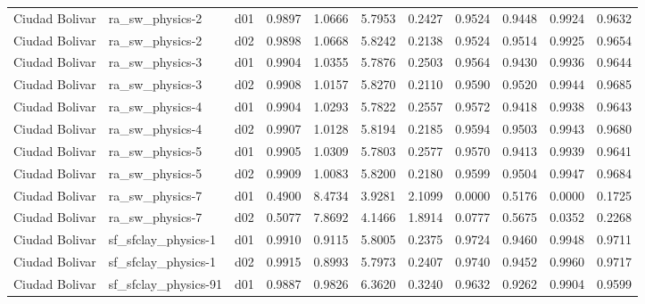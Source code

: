 \begin{longtable}{lllrrrrrrrr}
       Ciudad Bolivar  &       ra\_sw\_physics-2 &     d01 &   0.9897 &   1.0666 &   5.7953 &       0.2427 &        0.9524 &       0.9448 &           0.9924 &  0.9632 \\
       Ciudad Bolivar  &       ra\_sw\_physics-2 &     d02 &   0.9898 &   1.0668 &   5.8242 &       0.2138 &        0.9524 &       0.9514 &           0.9925 &  0.9654 \\
       Ciudad Bolivar  &       ra\_sw\_physics-3 &     d01 &   0.9904 &   1.0355 &   5.7876 &       0.2503 &        0.9564 &       0.9430 &           0.9936 &  0.9644 \\
       Ciudad Bolivar  &       ra\_sw\_physics-3 &     d02 &   0.9908 &   1.0157 &   5.8270 &       0.2110 &        0.9590 &       0.9520 &           0.9944 &  0.9685 \\
       Ciudad Bolivar  &       ra\_sw\_physics-4 &     d01 &   0.9904 &   1.0293 &   5.7822 &       0.2557 &        0.9572 &       0.9418 &           0.9938 &  0.9643 \\
       Ciudad Bolivar  &       ra\_sw\_physics-4 &     d02 &   0.9907 &   1.0128 &   5.8194 &       0.2185 &        0.9594 &       0.9503 &           0.9943 &  0.9680 \\
       Ciudad Bolivar  &       ra\_sw\_physics-5 &     d01 &   0.9905 &   1.0309 &   5.7803 &       0.2577 &        0.9570 &       0.9413 &           0.9939 &  0.9641 \\
       Ciudad Bolivar  &       ra\_sw\_physics-5 &     d02 &   0.9909 &   1.0083 &   5.8200 &       0.2180 &        0.9599 &       0.9504 &           0.9947 &  0.9684 \\
       Ciudad Bolivar  &       ra\_sw\_physics-7 &     d01 &   0.4900 &   8.4734 &   3.9281 &       2.1099 &        0.0000 &       0.5176 &           0.0000 &  0.1725 \\
       Ciudad Bolivar  &       ra\_sw\_physics-7 &     d02 &   0.5077 &   7.8692 &   4.1466 &       1.8914 &        0.0777 &       0.5675 &           0.0352 &  0.2268 \\
       Ciudad Bolivar  &   sf\_sfclay\_physics-1 &     d01 &   0.9910 &   0.9115 &   5.8005 &       0.2375 &        0.9724 &       0.9460 &           0.9948 &  0.9711 \\
       Ciudad Bolivar  &   sf\_sfclay\_physics-1 &     d02 &   0.9915 &   0.8993 &   5.7973 &       0.2407 &        0.9740 &       0.9452 &           0.9960 &  0.9717 \\
       Ciudad Bolivar  &  sf\_sfclay\_physics-91 &     d01 &   0.9887 &   0.9826 &   6.3620 &       0.3240 &        0.9632 &       0.9262 &           0.9904 &  0.9599 \\

\end{longtable}
